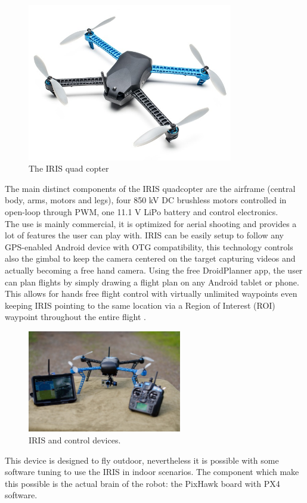 \begin{figure}[h]
\centering
 \noindent
 \includegraphics[width=0.8\textwidth]{iris.jpg}
 \caption{The IRIS quad copter}
 \label{figure:iris}
\end{figure}
\noindent
The main distinct components of the IRIS quadcopter are the airframe (central body, arms, motors and legs), four 850 kV DC brushless motors controlled in open-loop through PWM, one 11.1 V LiPo battery and control electronics.\\ 
The use is mainly commercial, it is optimized for aerial shooting and provides a lot of features the user can play with. IRIS can be easily setup to follow any GPS-enabled Android device with OTG compatibility, this technology controls also the gimbal to keep the camera centered on the target capturing videos and actually becoming a free hand camera. Using the free DroidPlanner app, the user can plan flights by simply drawing a flight plan on any Android tablet or phone. This allows for hands free flight control with virtually unlimited waypoints even keeping IRIS pointing to the same location via a Region of Interest (ROI) waypoint throughout the entire flight \cite{IRIS}.


\begin{figure}[h]
 \centering
 \includegraphics[width=0.6\textwidth]{iris_planner.jpg}
 \caption[IRIS and control devices]{IRIS and control devices.}
 \label{figure:iris_planner}
\end{figure}
This device is designed to fly outdoor, nevertheless it is possible with some software tuning to use the IRIS in indoor scenarios. The component which make this possible is the actual brain of the robot: the PixHawk board with PX4 software. 

